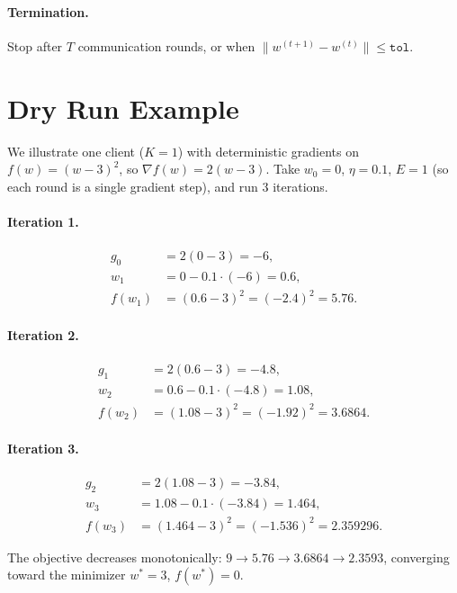 \documentclass[11pt]{article}
\begin{document}
\paragraph{Termination.} Stop after $T$ communication rounds, or when
$\|w^{(t+1)} - w^{(t)}\| \le \texttt{tol}$.

\section*{Dry Run Example}

We illustrate one client ($K=1$) with deterministic gradients on
$f(w) = (w-3)^2$, so $\nabla f(w) = 2(w-3)$.
Take $w_0 = 0$, $\eta = 0.1$, $E=1$ (so each round is a single gradient step),
and run $3$ iterations.

\paragraph{Iteration 1.}
\begin{align*}
g_0 &= 2(0-3) = -6, \\
w_1 &= 0 - 0.1\cdot(-6) = 0.6, \\
f(w_1) &= (0.6-3)^2 = (-2.4)^2 = 5.76 .
\end{align*}

\paragraph{Iteration 2.}
\begin{align*}
g_1 &= 2(0.6-3) = -4.8, \\
w_2 &= 0.6 - 0.1\cdot(-4.8) = 1.08, \\
f(w_2) &= (1.08-3)^2 = (-1.92)^2 = 3.6864 .
\end{align*}

\paragraph{Iteration 3.}
\begin{align*}
g_2 &= 2(1.08-3) = -3.84, \\
w_3 &= 1.08 - 0.1\cdot(-3.84) = 1.464, \\
f(w_3) &= (1.464-3)^2 = (-1.536)^2 = 2.359296 .
\end{align*}

The objective decreases monotonically: $9 \to 5.76 \to 3.6864 \to 2.3593$,
converging toward the minimizer $w^*=3$, $f(w^*)=0$.
\end{document}
